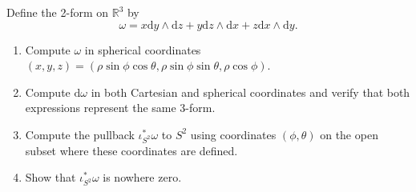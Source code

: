 \documentclass[10pt, letterpaper]{article}
\begin{document}
\begin{problem}
	Define the 2-form on $\mathbb{R} ^3$ by
	\[
		\omega =x\mathrm{d} y\wedge \mathrm{d} z+y\mathrm{d} z\wedge \mathrm{d} x+z\mathrm{d} x\wedge \mathrm{d} y
	.\]
	\begin{enumerate}
		\item Compute $\omega $ in spherical coordinates $(x,y,z)=(\rho \sin \phi \cos \theta ,\rho \sin \phi \sin \theta ,\rho \cos \phi )$.
		\item Compute $\mathrm{d} \omega $ in both Cartesian and spherical coordinates and verify that both expressions represent the same 3-form.
		\item Compute the pullback $\iota ^*_{S^2} \omega $ to $S^2$ using coordinates $(\phi ,\theta )$ on the open subset where these coordinates are defined.
		\item Show that $\iota ^*_{S^2} \omega $ is nowhere zero.
	\end{enumerate}
\end{problem}
\end{document}
